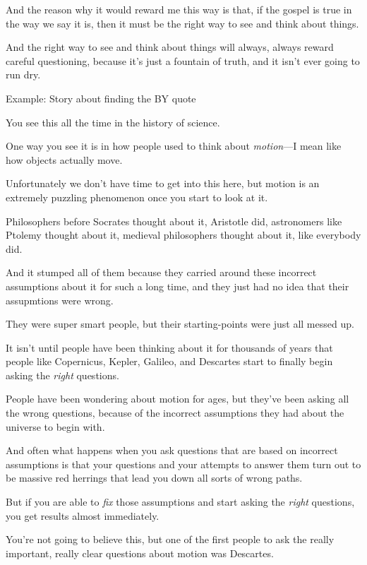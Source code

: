 \begin{compactitem}
\begin{compactitem}
					\item And the reason why it would reward me this way is that, if the gospel is true in the way we say it is, then it must be the right way to see and think about things.
					\item And the right way to see and think about things will always, always reward careful questioning, because it's just a fountain of truth, and it isn't ever going to run dry.
					\item Example: Story about finding the BY quote
						\begin{compactitem}
							\item You see this all the time in the history of science.
							\item One way you see it is in how people used to think about \textit{motion}---I mean like how objects actually move.
							\item Unfortunately we don't have time to get into this here, but motion is an extremely puzzling phenomenon once you start to look at it.
							\item Philosophers before Socrates thought about it, Aristotle did, astronomers like Ptolemy thought about it, medieval philosophers thought about it, like everybody did.
							\item And it stumped all of them because they carried around these incorrect assumptions about it for such a long time, and they just had no idea that their assupmtions were wrong.
							\item They were super smart people, but their starting-points were just all messed up.
							\item It isn't until people have been thinking about it for thousands of years that people like Copernicus, Kepler, Galileo, and Descartes start to finally begin asking the \textit{right} questions.
							\item People have been wondering about motion for ages, but they've been asking all the wrong questions, because of the incorrect assumptions they had about the universe to begin with.
							\item And often what happens when you ask questions that are based on incorrect assumptions is that your questions and your attempts to answer them turn out to be massive red herrings that lead you down all sorts of wrong paths.
							\item But if you are able to \textit{fix} those assumptions and start asking the \textit{right} questions, you get results almost immediately.
							\item You're not going to believe this, but one of the first people to ask the really important, really clear questions about motion was Descartes.

\end{compactitem}
\end{compactitem}
\end{compactitem}
